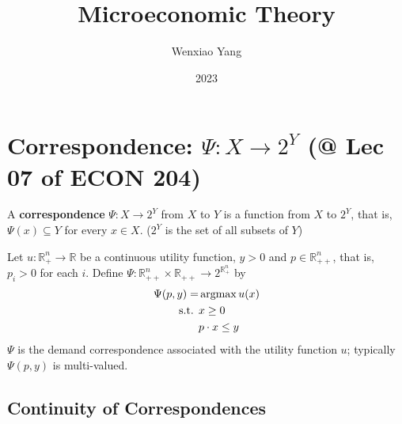 \documentclass[11pt]{elegantbook}
\title{\textbf{Microeconomic Theory}}
\author{Wenxiao Yang}
\institute{Haas School of Business, University of California Berkeley}
\date{2023}
\newcommand{\argmax}{\operatornamewithlimits{argmax}}
\begin{document}
\maketitle
\frontmatter
\tableofcontents
\mainmatter




\chapter{Correspondence: $\Psi : X \rightarrow 2^Y$ \small{(@ Lec 07 of ECON 204)}}
\begin{definition}[Correspondence]
    \normalfont
    A \textbf{correspondence} $\Psi : X \rightarrow 2^Y$ from $X$ to $Y$ is a function from $X$ to $2^Y$, that is, $\Psi(x) \subseteq Y$ for every $x \in X$. ($2^Y$ is the set of all subsets of $Y$)
\end{definition}
\begin{example}
Let $u : \mathbb{R}_+^n \rightarrow \mathbb{R}$ be a continuous utility function, $y > 0$ and $p \in \mathbb{R}_{++}^n$, that is, $p_i > 0$ for each $i$. Define $\Psi : \mathbb{R}_{++}^n \times \mathbb{R}_{++} \rightarrow 2^{\mathbb{R}_{+}^n}$ by
\begin{equation}
    \begin{aligned}
        \Psi(p,y)=&\argmax u(x)\\
        \textnormal{s.t. }&x\geq 0\\
        &p\cdot x\leq y
    \end{aligned}
    \nonumber
\end{equation}
$\Psi$ is the demand correspondence associated with the utility function $u$; typically $\Psi(p, y)$ is multi-valued.
\end{example}

\section{Continuity of Correspondences}
\end{document}
